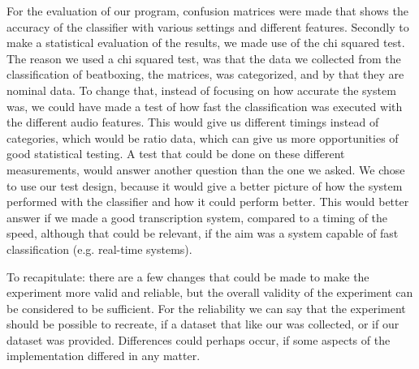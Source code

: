 
For the evaluation of our program, confusion matrices were made that shows the accuracy of the classifier with various settings and different features. Secondly to make a statistical evaluation of the results, we made use of the chi squared test. The reason we used a chi squared test, was that the data we collected from the classification of beatboxing, the matrices, was categorized, and by that they are nominal data. To change that, instead of focusing on how accurate the system was, we could have made a test of how fast the classification was executed with the different audio features. This would give us different timings instead of categories, which would be ratio data, which can give us more opportunities of good statistical testing. A test that could be done on these different measurements, would answer another question than the one we asked. We chose to use our test design, because it would give a better picture of how the system performed with the classifier and how it could perform better. This would better answer if we made a good transcription system, compared to a timing of the speed, although that could be relevant, if the aim was a system capable of fast classification (e.g. real-time systems).


To recapitulate: there are a few changes that could be made to make the experiment more valid and reliable, but the overall validity of the experiment can be considered to be sufficient. For the reliability we can say that the experiment should be possible to recreate, if a dataset that like our was collected, or if our dataset was provided. Differences could perhaps occur, if some aspects of the implementation differed in any matter.